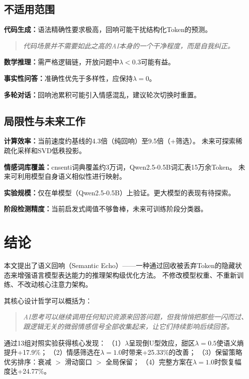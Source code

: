 \documentclass[a4paper, 11pt]{article}
\begin{document}
\subsection{不适用范围}

\textbf{代码生成：}语法精确性要求极高，回响可能干扰结构化Token的预测。
\begin{quote}\small\itshape
代码场景并不需要如此之高的AI本身的一个干净程度，而是自我纠正。
\end{quote}

\textbf{数学推理：}需严格逻辑链，开放问题中$\lambda<0.3$可能有益。

\textbf{事实性问答：}准确性优先于多样性，应保持$\lambda=0$。

\textbf{多轮对话：}回响池累积可能引入情感混乱，建议轮次切换时重置。

\subsection{局限性与未来工作}

\textbf{计算效率：}当前速度约基线的4.3倍（纯回响）至9.5倍（+筛选）。
未来可探索稀疏化采样和SVD低秩投影。

\textbf{情感词库覆盖：}cnsenti词典覆盖约3万词，Qwen2.5-0.5B词汇表15万余Token。
未来可利用模型自身语义相似性进行映射。

\textbf{实验规模：}仅在单模型（Qwen2.5-0.5B）上验证。更大模型的表现有待探索。

\textbf{阶段检测精度：}当前启发式阈值不够鲁棒，未来可训练阶段分类器。


\section{结论}

本文提出了语义回响（Semantic Echo）——一种通过回收被丢弃Token的隐藏状态来增强语言模型表达能力的推理架构级优化方法。
不修改模型权重、不重新训练、不改动核心注意力架构。

其核心设计哲学可以概括为：
\begin{quote}\small\itshape
AI思考可以继续调用任何知识资源来回答问题，但我悄悄把那些一闪而过、跟逻辑无关的微弱情感信号全部收集起来，让它们持续影响后续回答。
\end{quote}

通过13组对照实验获得核心发现：
（1）$\lambda$呈现倒U型效应，甜区$\lambda=0.5$使语义熵提升+17.9\%；
（2）情感筛选在$\lambda=1.0$时带来+25.33\%的改善；
（3）保留策略优劣排序：衰减 $>$ 滑动窗口 $>$ 全局保留；
（4）完整方案在$\lambda=1.0$时恢复幅度达+24.77\%。
\end{document}
